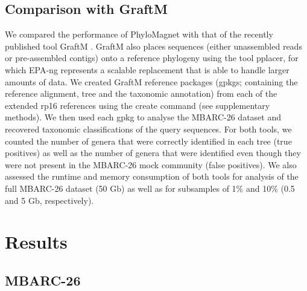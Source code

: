 \documentclass{bioinfo}
\begin{document}
\begin{methods}
\subsection{Comparison with GraftM}
We compared the performance of PhyloMagnet with that of the recently published tool GraftM \citep{Boyd2018}. GraftM also places sequences (either unassembled reads or pre-assembled contigs) onto a reference phylogeny using the tool pplacer, for which EPA-ng represents a scalable replacement that is able to handle larger amounts of data.
We created GraftM reference packages (gpkgs; containing the reference alignment, tree and the taxonomic annotation) from each of the extended rp16 references using the create command (see supplementary methods). We then used each gpkg to analyse the MBARC-26 dataset and recovered taxonomic classifications of the query sequences.
For both tools, we counted the number of genera that were correctly identified in each tree (true positives) as well as the number of genera that were identified even though they were not present in the MBARC-26 mock community (false positives). We also assessed the runtime and memory consumption of both tools for analysis of the full MBARC-26 dataset (50 Gb) as well as for subsamples of 1\% and 10\% (0.5 and 5 Gb, respectively).

\end{methods}

\section{Results}
\subsection{MBARC-26}
\end{document}
